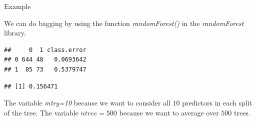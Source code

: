 \documentclass[ignorenonframetext,]{beamer}
\newenvironment{Shaded}{\begin{snugshade}}{\end{snugshade}}
\newcommand{\KeywordTok}[1]{\textcolor[rgb]{0.13,0.29,0.53}{\textbf{#1}}}
\newcommand{\DataTypeTok}[1]{\textcolor[rgb]{0.13,0.29,0.53}{#1}}
\newcommand{\DecValTok}[1]{\textcolor[rgb]{0.00,0.00,0.81}{#1}}
\newcommand{\StringTok}[1]{\textcolor[rgb]{0.31,0.60,0.02}{#1}}
\newcommand{\OtherTok}[1]{\textcolor[rgb]{0.56,0.35,0.01}{#1}}
\newcommand{\OperatorTok}[1]{\textcolor[rgb]{0.81,0.36,0.00}{\textbf{#1}}}
\newcommand{\NormalTok}[1]{#1}
\begin{document}
\begin{frame}[fragile]

\begin{block}{Example}

We can do bagging by using the function \emph{randomForest()} in the
\emph{randomForest} library.

\footnotesize

\begin{Shaded}
\end{Shaded}

\begin{verbatim}
##     0  1 class.error
## 0 644 48   0.0693642
## 1  85 73   0.5379747
\end{verbatim}

\begin{Shaded}
\end{Shaded}

\begin{verbatim}
## [1] 0.156471
\end{verbatim}

\normalsize

The variable \emph{mtry=10} because we want to consider all \(10\)
predictors in each split of the tree. The variable \(ntree=500\) because
we want to average over \(500\) trees.

\end{block}

\end{frame}
\end{document}
